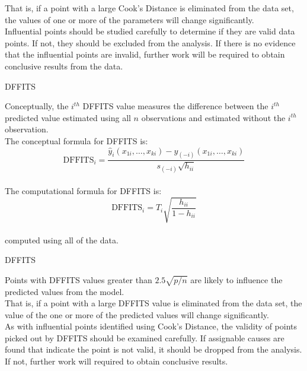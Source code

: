 {{\vspace{0.5in}
That is, if a point with a large Cook's Distance is eliminated from the 
data set, the values of one or more of the parameters will change 
significantly. \\
\vspace{0.5in}
Influential points should be studied carefully
to determine if they are valid data points.  If not, they should be excluded from the
analysis.  If there is no evidence that the influential points are invalid, further
work will be required to obtain conclusive results from the data.
\newpage
\begin{center}
DFFITS
\end{center}
\vspace{0.5in}
Conceptually, the $i^{th}$ DFFITS value measures the difference
between the $i^{th}$ predicted value estimated using all $n$ observations
and estimated without the $i^{th}$ observation. \\
\vspace{0.5in}
The conceptual formula for DFFITS is: 
\vspace{0.15in}
\[ \mbox{DFFITS}_i = \frac{\hat{y}_i(x_{1i},\ldots,x_{ki}) - \hat{y}_{(-i)}(x_{1i},\ldots,x_{ki})}{s_{(-i)}\sqrt{h_{ii}}}  \] \\
\vspace{0.5in}
The computational formula for DFFITS is: 
\vspace{0.15in}
\[ \mbox{DFFITS}_i = T_i\sqrt{\frac{h_{ii}}{1-h_{ii}}} \] \\
\vspace{0.15in}
computed using all of the data.
\newpage
\begin{center}
DFFITS
\end{center}
\vspace{0.5in}
Points with DFFITS values greater than $2.5\sqrt{p/n}$ are likely to influence 
the predicted values from the model. \\
\vspace{0.5in}
That is, if a point with a large DFFITS value is eliminated from the data set, the 
value of the one or more of the predicted values will change significantly. \\
\vspace{0.5in}
As with influential points identified using Cook's Distance, the validity of 
points picked out by DFFITS should be examined carefully.  If assignable causes
are found that indicate the point is not valid, it should be dropped from the
analysis.  If not, further work will required to obtain conclusive results.
}}
